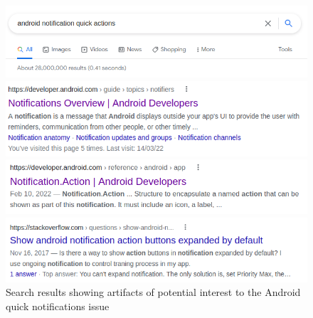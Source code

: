 
\vspace{3mm}
\begin{figure}
\centering    
\parbox{\textwidth}{%
\centering
\includegraphics[width=.75\textwidth]{cp1/task-google-search}
}
\parbox{\textwidth}{%
\centering
\includegraphics[width=.68\textwidth]{cp1/api-documentation-search-result}
}
\parbox{\textwidth}{%
\centering
\includegraphics[width=.68\textwidth]{cp1/notification-api}
}
\parbox{\textwidth}{%
\centering
\includegraphics[width=.68\textwidth]{cp1/so-documentation-search-result}
}
\caption{Search results showing artifacts of potential interest to the Android quick notifications issue}
\label{fig:android-search-results}
\end{figure}

